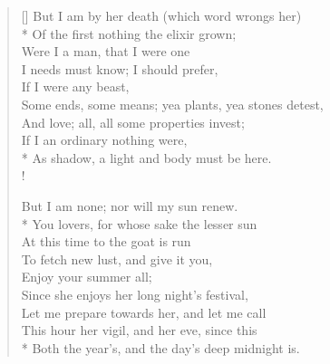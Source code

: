\documentclass[MAIN]{subfiles}
\begin{document}
\begin{verse}[\versewidth]
But I am by her death (which word wrongs her)\\*
Of the first nothing the elixir grown;\\
\vin Were I a man, that I were one\\
\vin I needs must know; I should prefer,\\
\vin \vin If I were any beast,\\
Some ends, some means; yea plants, yea stones detest,\\
And love; all, all some properties invest;\\
If I an ordinary nothing were,\\*
As shadow, a light and body must be here.\\!

But I am none; nor will my sun renew.\\*
You lovers, for whose sake the lesser sun\\
\vin At this time to the goat is run\\
\vin To fetch new lust, and give it you,\\
\vin \vin Enjoy your summer all;\\
Since she enjoys her long night's festival,\\
Let me prepare towards her, and let me call\\
This hour her vigil, and her eve, since this\\*
Both the year's, and the day's deep midnight is.
\end{verse}
\end{document}
